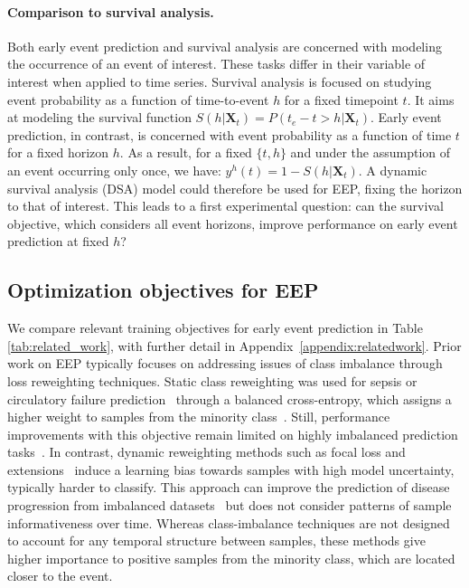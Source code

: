 \documentclass[nohyperref]{article}
\begin{document}
\paragraph{Comparison to survival analysis.} Both early event prediction and survival analysis are concerned with modeling the occurrence of an event of interest. These tasks differ in their variable of interest when applied to time series. Survival analysis is focused on studying event probability as a function of time-to-event $h$ for a fixed timepoint $t$. It aims at modeling the survival function $S(h \vert \mathbf{X}_t) = P(t_e-t > h \vert \mathbf{X}_t)$. Early event prediction, in contrast, is concerned with event probability as a function of time $t$ for a fixed horizon $h$. As a result, for a fixed $\{t,h\}$ and under the assumption of an event occurring only once, we have: $y^h(t) = 1- S(h \vert \mathbf{X}_t) $. A dynamic survival analysis (DSA) model could therefore be used for EEP, fixing the horizon to that of interest.  This leads to a first experimental question: can the survival objective, which considers all event horizons, improve performance on early event prediction at fixed $h$?





\subsection{Optimization objectives for EEP} 

We compare relevant training objectives for early event prediction in Table \ref{tab:related_work}, with further detail in Appendix~\ref{appendix:relatedwork}. Prior work on EEP typically focuses on addressing issues of class imbalance through loss reweighting techniques. Static class reweighting was used for sepsis or circulatory failure prediction~\citep{futoma2017learning,hyland2020} through a balanced cross-entropy, which assigns a higher weight to samples from the minority class~\citep{king2001logistic}. Still, performance improvements with this objective remain limited on highly imbalanced prediction tasks~\citep{yeche2021}. In contrast, dynamic reweighting methods such as focal loss and extensions~\citep{lin2017, polyloss} induce a learning bias towards samples with high model uncertainty, typically harder to classify. This approach can improve the prediction of disease progression from imbalanced datasets~\citep{wang2020feature,roy2022disability} but does not consider patterns of sample informativeness over time. Whereas class-imbalance techniques are not designed to account for any temporal structure between samples, these methods give higher importance to positive samples from the minority class, which are located closer to the event.
\end{document}
